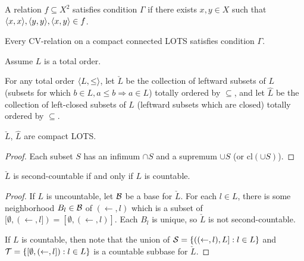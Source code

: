 \documentclass[11pt]{article}
\renewcommand{\cl}{\textrm{cl}}
\begin{document}
  \begin{definition}
    A relation \(f\subseteq X^2\)
    satisfies condition \(\Gamma\) if there exists \(x,y\in X\) such that
    \(\langle x,x\rangle,\langle y,y\rangle,\langle x,y\rangle\in f\).
  \end{definition}

  \begin{theorem}
    Every CV-relation on a compact connected LOTS satisfies condition \(\Gamma\).
  \end{theorem}





\newpage

  Assume \(L\) is a total order.

  \begin{definition}
    For any total order \(\langle L,\leq\rangle\), let \(\check L\) be the collection of
    leftward subsets of \(L\)
    (subsets for which \(b\in L,a\leq b\Rightarrow a\in L\))
    totally ordered by \(\subseteq\), and let \(\hat L\) be the collection
    of left-closed subsets of \(L\) (leftward subsets which are closed)
    totally ordered by \(\subseteq\).
  \end{definition}

  \begin{proposition}
    \(\check L\), \(\hat L\) are compact LOTS.
  \end{proposition}

  \begin{proof}
    Each subset \(S\) has an infimum \(\cap S\) and a supremum \(\cup S\)
    (or \(\cl(\cup S)\)).
  \end{proof}

  \begin{theorem}
    \(\check L\) is second-countable if and only if \(L\) is countable.
  \end{theorem}

  \begin{proof}
    If \(L\) is uncountable, let \(\mathcal{B}\) be a base for \(\check L\).
    For each \(l\in L\), there is some neighborhood \(B_l\in\mathcal{B}\) of
    \((\leftarrow,l)\) which is a subset of
    \([\emptyset,(\leftarrow,l])=[\emptyset,(\leftarrow,l)]\). Each \(B_l\)
    is unique, so \(\check L\) is not second-countable.

    If \(L\) is countable, then note that the union of
    \(\mathcal{S}=\{((\leftarrow,l),L]:l\in L\}\) and
    \(\mathcal{T}=\{[\emptyset,(\leftarrow,l]):l\in L\}\)
    is a countable subbase for \(\check L\).
  \end{proof}
\end{document}
